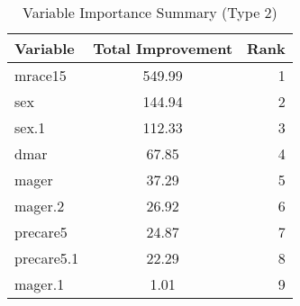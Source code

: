\begingroup
\begin{table}[htbp]
\centering
\setlength{\tabcolsep}{0.5em}
\renewcommand{\arraystretch}{0.9}
\footnotesize
\caption{Variable Importance Summary (Type 2)}
\label{tab:var_imp_summary_type2_optimized}
\begin{tabular}{lcr}
\hline
Variable & Total Improvement & Rank \\ \hline
mrace15 & 549.99 & 1 \\
sex & 144.94 & 2 \\
sex.1 & 112.33 & 3 \\
dmar & 67.85 & 4 \\
mager & 37.29 & 5 \\
mager.2 & 26.92 & 6 \\
precare5 & 24.87 & 7 \\
precare5.1 & 22.29 & 8 \\
mager.1 & 1.01 & 9 \\
\hline
\end{tabular}
\end{table}
\endgroup
